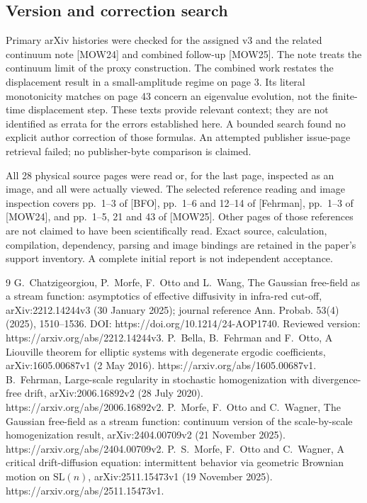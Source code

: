 \documentclass[10pt]{article}
\begin{document}
\subsection*{Version and correction search}
Primary arXiv histories were checked for the assigned v3 and the related continuum note [MOW24] and combined follow-up [MOW25]. The note treats the continuum limit of the proxy construction. The combined work restates the displacement result in a small-amplitude regime on page 3. Its literal monotonicity matches on page 43 concern an eigenvalue evolution, not the finite-time displacement step. These texts provide relevant context; they are not identified as errata for the errors established here. A bounded search found no explicit author correction of those formulas. An attempted publisher issue-page retrieval failed; no publisher-byte comparison is claimed.\par
All 28 physical source pages were read or, for the last page, inspected as an image, and all were actually viewed. The selected reference reading and image inspection covers pp. 1–3 of [BFO], pp. 1–6 and 12–14 of [Fehrman], pp. 1–3 of [MOW24], and pp. 1–5, 21 and 43 of [MOW25]. Other pages of those references are not claimed to have been scientifically read. Exact source, calculation, compilation, dependency, parsing and image bindings are retained in the paper’s support inventory. A complete initial report is not independent acceptance.\par
9 G. Chatzigeorgiou, P. Morfe, F. Otto and L. Wang, The Gaussian free-field as a stream function: asymptotics of effective diffusivity in infra-red cut-off, arXiv:2212.14244v3 (30 January 2025); journal reference Ann. Probab. 53(4) (2025), 1510–1536. DOI: https://doi.org/10.1214/24-AOP1740. Reviewed version: https://arxiv.org/abs/2212.14244v3. P. Bella, B. Fehrman and F. Otto, A Liouville theorem for elliptic systems with degenerate ergodic coefficients, arXiv:1605.00687v1 (2 May 2016). https://arxiv.org/abs/1605.00687v1. B. Fehrman, Large-scale regularity in stochastic homogenization with divergence-free drift, arXiv:2006.16892v2 (28 July 2020). https://arxiv.org/abs/2006.16892v2. P. Morfe, F. Otto and C. Wagner, The Gaussian free-field as a stream function: continuum version of the scale-by-scale homogenization result, arXiv:2404.00709v2 (21 November 2025). https://arxiv.org/abs/2404.00709v2. P. S. Morfe, F. Otto and C. Wagner, A critical drift-diffusion equation: intermittent behavior via geometric Brownian motion on \(\mathrm{SL}(n)\), arXiv:2511.15473v1 (19 November 2025). https://arxiv.org/abs/2511.15473v1.\par
\end{document}
